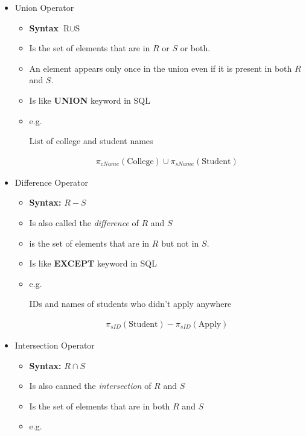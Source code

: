 \documentclass[12pt]{article}
\begin{document}
\begin{enumerate}
\begin{enumerate}[a)]
\begin{itemize}
\begin{itemize}
            \end{itemize}

            \item Union Operator
            \begin{itemize}
                \item \textbf{Syntax} $\text{R} \cup \text{S}$
                \item Is the set of elements that are in $R$ or $S$ or both.
                \item An element appears only once in the union even if it is
                    present in both $R$ and $S$.
                \item Is like \textbf{UNION} keyword in SQL
                \item e.g.

                \bigskip

                List of college and student names

                \begin{align*}
                    \pi_{cName}(\text{College}) \cup \pi_{sName} (\text{Student})
                \end{align*}
            \end{itemize}


            \item Difference Operator
            \begin{itemize}
                \item \textbf{Syntax:} $R - S$
                \item Is also called the \textit{difference} of $R$ and $S$
                \item is the set of elements that are in $R$ but not in $S$.
                \item Is like \textbf{EXCEPT} keyword in SQL
                \item e.g.

                \bigskip

                IDs and names of students who didn't apply anywhere

                \begin{align*}
                    \pi_{sID} (\text{Student}) - \pi_{sID}(\text{Apply})
                \end{align*}
            \end{itemize}

            \item Intersection Operator
            \begin{itemize}
                \item \textbf{Syntax:} $R \cap S$
                \item Is also canned the \textit{intersection} of $R$ and $S$
                \item Is the set of elements that are in both $R$ and $S$
                \item e.g.


\end{itemize}
\end{itemize}
\end{enumerate}
\end{enumerate}
\end{document}
